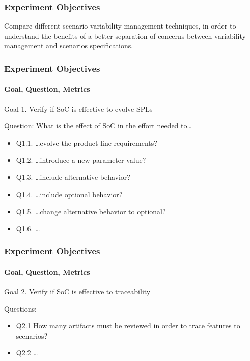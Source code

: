 \documentclass{beamer}
\begin{document}
\begin{frame}
\frametitle{Experiment Objectives}

Compare different scenario variability management techniques, in order to
understand the benefits of a better separation of concerns between variability
management and scenarios specifications.

\end{frame}

\begin{frame}
\frametitle{Experiment Objectives}
\framesubtitle{Goal, Question, Metrics}

\begin{block}{Goal 1. Verify if SoC is effective to evolve SPLs} 

Question: What is the effect of SoC in the effort needed to\ldots
\small{
\begin{itemize}
  \item Q1.1. \ldots evolve the product line requirements?
  \item Q1.2. \ldots introduce a new parameter value?
  \item Q1.3. \ldots include alternative behavior?
  \item Q1.4. \ldots include optional behavior?
  \item Q1.5. \ldots change alternative behavior to optional?
  \item Q1.6. \ldots 
\end{itemize}
}
\end{block}

\end{frame}

\begin{frame}
\frametitle{Experiment Objectives}
\framesubtitle{Goal, Question, Metrics}

\begin{block}{Goal 2. Verify if SoC is effective to traceability} 

Questions:
\small{
\begin{itemize}
  \item Q2.1 How many artifacts must be reviewed in order to trace features to scenarios?
  \item Q2.2 \ldots
\end{itemize}
}
\end{block}
\end{frame}
\end{document}
